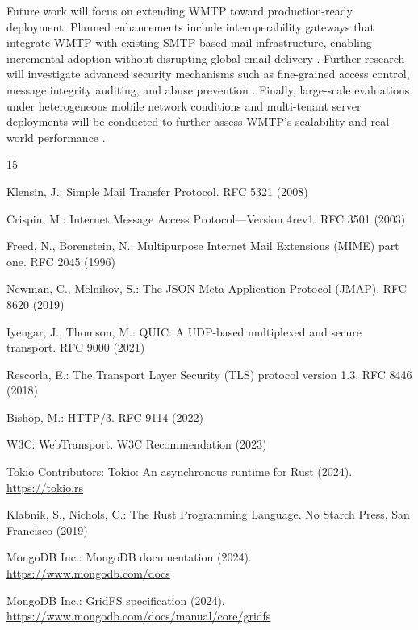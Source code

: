 \documentclass[10pt,a4paper]{article}
\begin{document}
Future work will focus on extending WMTP toward production-ready deployment. Planned enhancements include interoperability gateways that integrate WMTP with existing SMTP-based mail infrastructure, enabling incremental adoption without disrupting global email delivery \cite{smtp,imap}. Further research will investigate advanced security mechanisms such as fine-grained access control, message integrity auditing, and abuse prevention \cite{tls13,jmap}. Finally, large-scale evaluations under heterogeneous mobile network conditions and multi-tenant server deployments will be conducted to further assess WMTP’s scalability and real-world performance \cite{quic,webtransport,rustasync}.

\footnotesize
\begin{thebibliography}{15}

Klensin, J.: Simple Mail Transfer Protocol. RFC 5321 (2008)

Crispin, M.: Internet Message Access Protocol—Version 4rev1. RFC 3501 (2003)

Freed, N., Borenstein, N.: Multipurpose Internet Mail Extensions (MIME) part one. RFC 2045 (1996)

Newman, C., Melnikov, S.: The JSON Meta Application Protocol (JMAP). RFC 8620 (2019)

Iyengar, J., Thomson, M.: QUIC: A UDP-based multiplexed and secure transport. RFC 9000 (2021)

Rescorla, E.: The Transport Layer Security (TLS) protocol version 1.3. RFC 8446 (2018)

Bishop, M.: HTTP/3. RFC 9114 (2022)

W3C: WebTransport. W3C Recommendation (2023)

Tokio Contributors: Tokio: An asynchronous runtime for Rust (2024). \url{https://tokio.rs}

Klabnik, S., Nichols, C.: The Rust Programming Language. No Starch Press, San Francisco (2019)

MongoDB Inc.: MongoDB documentation (2024). \url{https://www.mongodb.com/docs}

MongoDB Inc.: GridFS specification (2024). \url{https://www.mongodb.com/docs/manual/core/gridfs}

\end{thebibliography}
\end{document}
